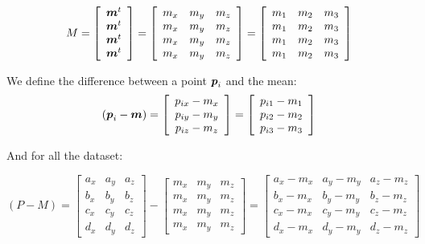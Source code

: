 \documentclass{article}
\begin{document}
$$
M =
\left[\begin{array}{c}
 \mbox{\boldmath$m$}^t \\
 \mbox{\boldmath$m$}^t \\
 \mbox{\boldmath$m$}^t \\
 \mbox{\boldmath$m$}^t
\end{array}\right]
=
\left[\begin{array}{ccc}
 m_x & m_y & m_z \\
 m_x & m_y & m_z \\
 m_x & m_y & m_z \\
 m_x & m_y & m_z
\end{array}\right]
=
\left[\begin{array}{ccc}
 m_1 & m_2 & m_3 \\
 m_1 & m_2 & m_3 \\
 m_1 & m_2 & m_3 \\
 m_1 & m_2 & m_3
\end{array}\right]
$$

We define the difference between a point $\mbox{\boldmath$p$}_i$ and the mean:
$$
(\mbox{\boldmath$p$}_i - \mbox{\boldmath$m$}) =
\left[\begin{array}{c}
 p_{ix} - m_x \\
 p_{iy} - m_y \\
 p_{iz} - m_z
\end{array}\right]
=
\left[\begin{array}{c}
 p_{i1} - m_1 \\
 p_{i2} - m_2 \\
 p_{i3} - m_3
\end{array}\right]
$$

And for all the dataset:

$$
(P - M) =
\left[\begin{array}{ccc}
 a_x & a_y & a_z \\
 b_x & b_y & b_z \\
 c_x & c_y & c_z \\
 d_x & d_y & d_z
\end{array}\right]
-
\left[\begin{array}{ccc}
 m_x & m_y & m_z \\
 m_x & m_y & m_z \\
 m_x & m_y & m_z \\
 m_x & m_y & m_z
\end{array}\right]
=
\left[\begin{array}{ccc}
 a_x - m_x & a_y - m_y & a_z - m_z \\
 b_x - m_x & b_y - m_y & b_z - m_z \\
 c_x - m_x & c_y - m_y & c_z - m_z \\
 d_x - m_x & d_y - m_y & d_z - m_z
\end{array}\right]
$$
\end{document}
